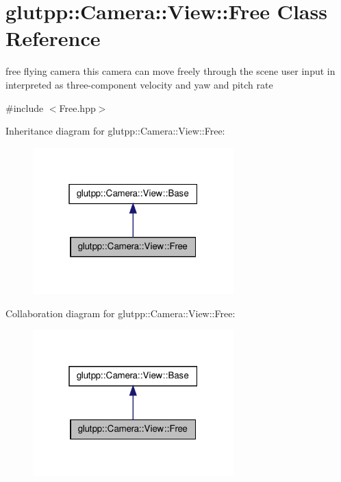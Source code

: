 \hypertarget{classglutpp_1_1Camera_1_1View_1_1Free}{\section{glutpp\-:\-:\-Camera\-:\-:\-View\-:\-:\-Free \-Class \-Reference}
\label{classglutpp_1_1Camera_1_1View_1_1Free}
}


free flying camera this camera can move freely through the scene user input in interpreted as three-\/component velocity and yaw and pitch rate  




{\ttfamily \#include $<$\-Free.\-hpp$>$}



\-Inheritance diagram for glutpp\-:\-:\-Camera\-:\-:\-View\-:\-:\-Free\-:
\nopagebreak
\begin{figure}[H]
\begin{center}
\leavevmode
\includegraphics[width=220pt]{classglutpp_1_1Camera_1_1View_1_1Free__inherit__graph}
\end{center}
\end{figure}


\-Collaboration diagram for glutpp\-:\-:\-Camera\-:\-:\-View\-:\-:\-Free\-:
\nopagebreak
\begin{figure}[H]
\begin{center}
\leavevmode
\includegraphics[width=220pt]{classglutpp_1_1Camera_1_1View_1_1Free__coll__graph}
\end{center}
\end{figure}
